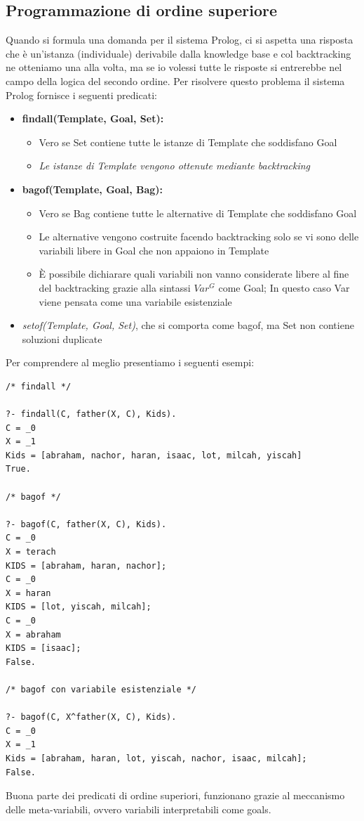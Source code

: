 \subsection{Programmazione di ordine superiore}
Quando si formula una domanda per il sistema Prolog, ci si aspetta una risposta che è un'istanza (individuale) derivabile dalla knowledge base
e col backtracking ne otteniamo una alla volta, ma se io volessi tutte le risposte si entrerebbe nel campo della logica del secondo ordine.\newline
Per risolvere questo problema il sistema Prolog fornisce i seguenti predicati:
\begin{itemize}
\item \textbf{findall(Template, Goal, Set):}
\begin{itemize}
\item Vero se Set contiene tutte le istanze di Template che soddisfano Goal
\item \textit{Le istanze di Template vengono ottenute mediante backtracking}
\end{itemize}
\item \textbf{bagof(Template, Goal, Bag):}
\begin{itemize}
\item Vero se Bag contiene tutte le alternative di Template che soddisfano Goal
\item Le alternative vengono costruite facendo backtracking solo se vi sono delle variabili libere in Goal che non appaiono in Template
\item È possibile dichiarare quali variabili non vanno considerate libere al fine del backtracking grazie alla sintassi $Var^G$ come Goal;
  In questo caso Var viene pensata come una variabile esistenziale
\end{itemize}
\item \textit{setof(Template, Goal, Set)}, che si comporta come bagof, ma Set non contiene soluzioni duplicate
\end{itemize}
Per comprendere al meglio presentiamo i seguenti esempi:
\begin{verbatim}
/* findall */

?- findall(C, father(X, C), Kids).
C = _0
X = _1
Kids = [abraham, nachor, haran, isaac, lot, milcah, yiscah]
True.

/* bagof */

?- bagof(C, father(X, C), Kids).
C = _0
X = terach
KIDS = [abraham, haran, nachor];
C = _0
X = haran
KIDS = [lot, yiscah, milcah];
C = _0
X = abraham
KIDS = [isaac];
False.

/* bagof con variabile esistenziale */

?- bagof(C, X^father(X, C), Kids).
C = _0
X = _1
Kids = [abraham, haran, lot, yiscah, nachor, isaac, milcah];
False.
\end{verbatim}
Buona parte dei predicati di ordine superiori, funzionano grazie al meccanismo delle meta-variabili, ovvero variabili interpretabili come goals.

